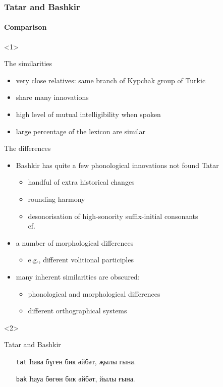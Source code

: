 \documentclass[10pt,xetex]{beamer} %
\newcommand{\compresslist}{
	\setlength{\itemsep}{1pt}
	\setlength{\parskip}{0pt}
	\setlength{\parsep}{0pt}
}
\begin{document}
\begin{frame}
	\frametitle{Tatar and Bashkir}
	\framesubtitle{Comparison}
 
  \begin{onlyenv}<1>
	 \begin{block}{The similarities}
	 	\begin{itemize}\compresslist
			\item very close relatives: same branch of Kypchak group of Turkic
			\item share many innovations
			\item high level of mutual intelligibility when spoken
			\item large percentage of the lexicon are similar
		\end{itemize}
	\end{block}

	\begin{block}{The differences}
		\begin{itemize}\compresslist
			\item Bashkir has quite a few phonological innovations not found Tatar
			\begin{itemize}
				\item handful of extra historical changes
				\item rounding harmony
				\item desonorisation of high-sonority suffix-initial consonants\\cf.\ \citet{washington10}
			\end{itemize}
			\item a number of morphological differences
			\begin{itemize}
				\item e.g., different volitional participles
			\end{itemize}
			\item many inherent similarities are obscured:
			\begin{itemize}
				\item phonological and morphological differences
				\item different orthographical systems
			\end{itemize}
		\end{itemize}
	\end{block}
  \end{onlyenv}
  \begin{onlyenv}<2>
	\begin{block}{Tatar and Bashkir}
		\begin{itemize}
			\item[{\small {\tt tat}}] Һава бүген бик әйбәт, җылы гына.  \\
			{}
			\item[{\small {\tt bak}}] Һауа бөгөн бик әйбәт, йылы ғына. \\
			{}
		\end{itemize}
	\end{block}


\end{onlyenv}
\end{frame}
\end{document}
